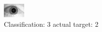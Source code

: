 \begin{figure}[h!]
\begin{center}
\includegraphics[width=0.60\columnwidth]{figures/ID1688_class_3_target_2.png}
\end{center}
\caption{ Classification: 3 actual target: 2}
\label{fig:ID1688_class_3_target_2}
\end{figure}
